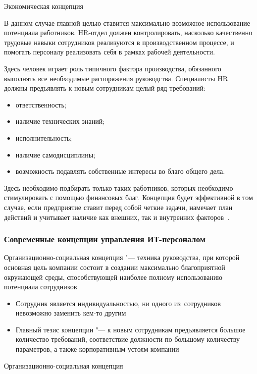 \documentclass{../industrial-development}
\begin{document}
\lecturenotes

\alert{Экономическая концепция}

В данном случае главной целью ставится максимально возможное использование потенциала работников. HR-отдел должен контролировать, насколько качественно трудовые навыки сотрудников реализуются в производственном процессе, и помогать персоналу реализовать себя в рамках рабочей деятельности.

Здесь человек играет роль типичного фактора производства, обязанного выполнять все необходимые распоряжения руководства. Специалисты HR должны предъявлять к новым сотрудникам целый ряд требований:
\begin{itemize}
\item ответственность;
\item	наличие технических знаний;
\item	исполнительность;
\item	наличие самодисциплины;
\item	возможность подавлять собственные интересы во благо общего дела.
\end{itemize}

Здесь необходимо подбирать только таких работников, которых необходимо стимулировать с помощью финансовых благ. Концепция будет эффективной в том случае, если предприятие ставит перед собой четкие задачи, намечает план действий и учитывает наличие как внешних, так и внутренних факторов~\cite{Sovrconcept}. 

\begin{frame} \frametitle{Современные концепции управления ИТ-персоналом}
 \alert{Организационно-социальная концепция} "--- техника руководства, при которой основная цель компании состоит в создании максимально благоприятной окружающей среды, способствующей наиболее полному использованию потенциала сотрудников
		  \begin{itemize}
			\item Сотрудник является индивидуальностью, ни одного из~сотрудников невозможно заменить кем-то другим
		\item Главный тезис концепции "---  к новым сотрудникам предъявляется большое количество требований, соответствие должности по большому количеству параметров, а также корпоративным устоям компании
		  \end{itemize}
\end{frame}

\lecturenotes

\alert{Организационно-социальная концепция}
\end{document}
